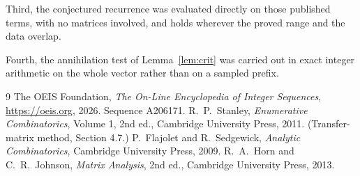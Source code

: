 \documentclass[11pt,a4paper]{article}
\theoremstyle{plain}
\theoremstyle{definition}
\begin{document}
Third, the conjectured recurrence was evaluated directly on those published terms, with no
matrices involved, and holds wherever the proved range and the data overlap.

Fourth, the annihilation test of Lemma~\ref{lem:crit} was carried out in exact integer
arithmetic on the whole vector rather than on a sampled prefix.

\begin{thebibliography}{9}
 The OEIS Foundation, \emph{The On-Line Encyclopedia of Integer
Sequences}, \url{https://oeis.org}, 2026. Sequence A206171.
 R.~P.~Stanley, \emph{Enumerative Combinatorics}, Volume 1, 2nd ed.,
Cambridge University Press, 2011. (Transfer-matrix method, Section 4.7.)
 P.~Flajolet and R.~Sedgewick, \emph{Analytic Combinatorics}, Cambridge
University Press, 2009.
 R.~A.~Horn and C.~R.~Johnson, \emph{Matrix Analysis}, 2nd ed., Cambridge
University Press, 2013.
\end{thebibliography}
\end{document}
